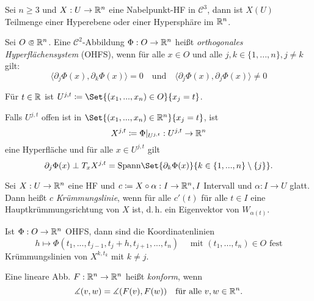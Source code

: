 \documentclass{cheat-sheet}
\begin{document}
\begin{satz}
  Sei $n \geq 3$ und $X : U \to \mathbb{R}^n$ eine Nabelpunkt-HF in $\mathcal{C}^3$, dann ist $X(U)$ Teilmenge einer Hyperebene oder einer Hypersphäre im $\mathbb{R}^n$.
\end{satz}

\begin{definition}
  Sei $O \opn \R^n$. Eine $\mathcal{C}^2$-Abbildung $\Phi : O \to \mathbb{R}^n$ heißt \emph{orthogonales Hyperflächensystem} (OHFS), wenn für alle $x \in O$ und alle $j, k \in \{ 1, ..., n \}, j \not= k$ gilt:
  \[
    \langle \partial_j \Phi(x), \partial_k \Phi(x) \rangle = 0
    \quad \text{und} \quad
    \langle \partial_j \Phi(x), \partial_j \Phi(x) \rangle \not= 0
  \]
\end{definition}

\begin{nota}
  Für $t \in \mathbb{R}$ ist $U^{j,t} \coloneqq \Set{ (x_1, ..., x_n) \in O }{ x_j = t }$.
\end{nota}

\begin{bem}
  Falls $U^{j,t}$ offen ist in $\Set{ (x_1, ..., x_n) \in \R^n }{ x_j = t }$, ist
  \[ X^{j,t} \coloneqq \Phi|_{U^{j,t}} : U^{j,t} \to \mathbb{R}^n \]
  eine Hyperfläche und für alle $x \in U^{j,t}$ gilt
  \[ \partial_j \Phi(x) \perp T_x X^{j,t} = \mathrm{Spann} \Set{ \partial_k \Phi(x) }{ k \in \{ 1, ..., n \} \setminus \{ j \} }. \]
\end{bem}

\begin{definition}
  Sei $X : U \to \mathbb{R}^n$ eine HF und $c \coloneqq X \circ \alpha : I \to \mathbb{R}^n, I$ Intervall und $\alpha : I \to U$ glatt. Dann heißt $c$ \emph{Krümmungslinie}, wenn für alle $c'(t)$ für alle $t \in I$ eine Hauptkrümmungsrichtung von $X$ ist, d.\,h. ein Eigenvektor von $W_{\alpha(t)}$.
\end{definition}

\begin{satz}
  Ist $\Phi : O \to \mathbb{R}^n$ OHFS, dann sind die Koordinatenlinien
  \[ h \mapsto \Phi(t_1, ..., t_{j-1}, t_j + h, t_{j+1}, ..., t_n) \quad \text{ mit } (t_1, ..., t_n) \in O \text{ fest} \]
  Krümmungslinien von $X^{k, t_k}$ mit $k \not= j$.
\end{satz}

\begin{definition}
  Eine lineare Abb. $F : \mathbb{R}^n \to \mathbb{R}^n$ heißt \emph{konform}, wenn
  \[ \measuredangle (v, w) = \measuredangle (F(v), F(w)) \quad \text{für alle } v, w \in \mathbb{R}^n. \]
\end{definition}
\end{document}
